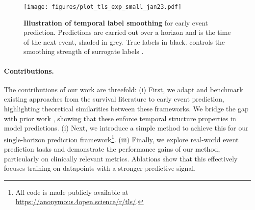\documentclass[nohyperref]{article}
\begin{document}
\begin{figure}[th] \centering
  \texttt{[image: figures/plot\_tls\_exp\_small\_jan23.pdf]}      
\caption{\textbf{Illustration of temporal label smoothing} for early event prediction. Predictions are carried out over a horizon  and  is the time of the next event, shaded in grey. True labels in black.  controls the smoothing strength of surrogate labels .}
  \label{fig:gamma_TLS}
  \vspace{-1em}
\end{figure}

\vspace{-1em}

\paragraph{Contributions.} The contributions of our work are threefold: 
(i) First, we adapt and benchmark existing approaches from the survival literature to early event prediction, highlighting theoretical similarities between these frameworks. We bridge the gap with prior work \citep{tomavsev2019,van2007dynamic, parast2014landmark}, showing that these enforce temporal structure properties in model predictions. (i) Next, we introduce a simple method to achieve this for our single-horizon prediction framework\footnote[1]{All code is made publicly available at \url{https://anonymous.4open.science/r/tls/}.}.
(iii) Finally, we explore real-world event prediction tasks and demonstrate the performance gains of our method, particularly on clinically relevant metrics. Ablations show that this effectively focuses training on datapoints with a stronger predictive signal.
\end{document}
